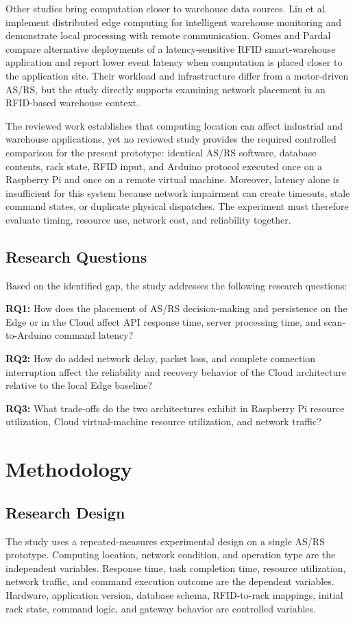 \documentclass[conference]{IEEEtran}
\begin{document}
Other studies bring computation closer to warehouse data sources. Lin et al. \cite{lin2021} implement distributed edge computing for intelligent warehouse monitoring and demonstrate local processing with remote communication. Gomes and Pardal \cite{gomes2018} compare alternative deployments of a latency-sensitive RFID smart-warehouse application and report lower event latency when computation is placed closer to the application site. Their workload and infrastructure differ from a motor-driven AS/RS, but the study directly supports examining network placement in an RFID-based warehouse context.

The reviewed work establishes that computing location can affect industrial and warehouse applications, yet no reviewed study provides the required controlled comparison for the present prototype: identical AS/RS software, database contents, rack state, RFID input, and Arduino protocol executed once on a Raspberry Pi and once on a remote virtual machine. Moreover, latency alone is insufficient for this system because network impairment can create timeouts, stale command states, or duplicate physical dispatches. The experiment must therefore evaluate timing, resource use, network cost, and reliability together.

\subsection{Research Questions}
Based on the identified gap, the study addresses the following research questions:

\noindent\textbf{RQ1:} How does the placement of AS/RS decision-making and persistence on the Edge or in the Cloud affect API response time, server processing time, and scan-to-Arduino command latency?

\noindent\textbf{RQ2:} How do added network delay, packet loss, and complete connection interruption affect the reliability and recovery behavior of the Cloud architecture relative to the local Edge baseline?

\noindent\textbf{RQ3:} What trade-offs do the two architectures exhibit in Raspberry Pi resource utilization, Cloud virtual-machine resource utilization, and network traffic?

\section{Methodology}

\subsection{Research Design}
The study uses a repeated-measures experimental design on a single AS/RS prototype. Computing location, network condition, and operation type are the independent variables. Response time, task completion time, resource utilization, network traffic, and command execution outcome are the dependent variables. Hardware, application version, database schema, RFID-to-rack mappings, initial rack state, command logic, and gateway behavior are controlled variables.
\end{document}
